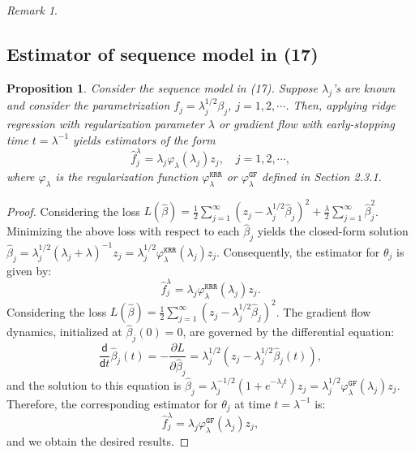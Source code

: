 \documentclass{article}
\theoremstyle{plain}
\newtheorem{proposition}[theorem]{Proposition}
\theoremstyle{definition}
\theoremstyle{remark}
\newtheorem{remark}[theorem]{Remark}
\newcommand{\reg}{\varphi_\lambda}
\newcommand*{\gf}{\mathtt{GF}}
\newcommand*{\krr}{\mathtt{KRR}}
\begin{document}
\begin{appendix}
\begin{remark}
\end{remark}










\subsection{Estimator of sequence model in (17)}
\begin{proposition}\label{prop_sequence_estimators}
    Consider the sequence model in (17). 
    Suppose $\lambda_j$'s are known and consider the parametrization $f_j = \lambda_j^{1/2} \beta_j$, $j=1, 2, \cdots$.
    Then, applying ridge regression with regularization parameter $\lambda$ or gradient flow with early-stopping time $t = \lambda^{-1}$ yields estimators of the form 
    $$
    \hat{f}_j^{\lambda} = \lambda_j \reg(\lambda_j) z_j,\quad j=1, 2, \cdots,
    $$
    where $\reg$ is the regularization function $\reg^{\krr}$ or $\reg^{\gf}$ defined in Section 2.3.1.
\end{proposition}
\begin{proof}
     Considering the loss $L(\hat{\beta})=\frac{1}{2}\sum_{j=1}^{\infty} (z_j - \lambda_j^{1/2} \hat{\beta}_j)^2 + \frac{\lambda}{2} \sum_{j=1}^{\infty} \hat{\beta}_j^2$. Minimizing the above loss with respect to each $\hat{\beta}_j$ yields the closed-form solution $\hat{\beta}_j = \lambda_j^{1/2} (\lambda_j + \lambda)^{-1} z_j = \lambda_j^{1/2} \reg^{\krr}(\lambda_j) z_j$. Consequently, the estimator for $\theta_j$ is given by:
    $$
        \hat{f}_j^{\lambda} = \lambda_j \reg^{\krr}(\lambda_j) z_j.
    $$
    Considering the loss $L(\hat{\beta})=\frac{1}{2}\sum_{j=1}^{\infty} (z_j - \lambda_j^{1/2} \hat{\beta}_j)^2$. 
    The gradient flow dynamics, initialized at $\hat{\beta}_j(0) = 0$, are governed by the differential equation:
\[
\frac{\mathsf d}{\mathsf d t} \hat{\beta}_j(t) = -\frac{\partial L}{\partial \hat{\beta}_j} = \lambda_j^{1/2} (z_j - \lambda_j^{1/2} \hat{\beta}_j(t)),
\]
and the solution to this equation is  $\hat{\beta}_j = \lambda_j^{-1/2} (1+e^{-\lambda_j t}) z_j= \lambda_j^{1/2} \reg^{\gf}(\lambda_j) z_j$. Therefore, the corresponding estimator for $\theta_j$ at time $t = \lambda^{-1}$ is:
    $$
        \hat{f}_j^{\lambda} = \lambda_j \reg^{\gf}(\lambda_j) z_j,
    $$
    and we obtain the desired results.
\end{proof}



\end{appendix}
\end{document}
